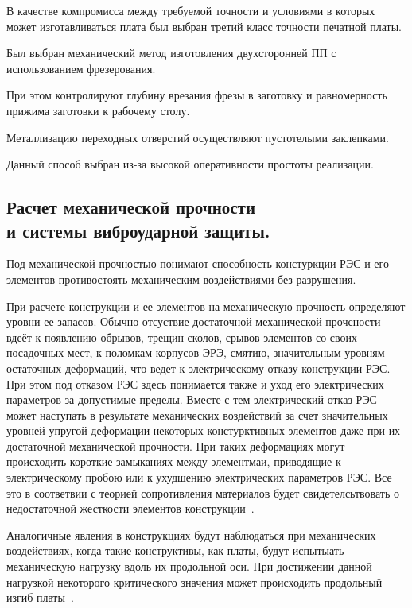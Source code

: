 В качестве компромисса между требуемой точности и условиями в которых
может изготавливаться плата был выбран третий класс точности печатной
платы.


% 
%
Был выбран механический метод изготовления двухсторонней ПП с
использованием фрезерования.

При этом контролируют глубину врезания фрезы
в заготовку и равномерность прижима заготовки к рабочему
столу.

Металлизацию переходных отверстий
осуществляют пустотелыми
заклепками.

Данный способ выбран из-за высокой оперативности простоты реализации.

\subsection{Расчет механической прочности \\
  и системы виброударной защиты.}

Под механической прочностью понимают способность констуркции РЭС и его
элементов противостоять механическим воздействиями без разрушения.

При расчете конструкции и ее элементов на механическую прочность
определяют уровни ее запасов.  Обычно отсуствие достаточной
механической прочсности вдеёт к появлению обрывов, трещин сколов,
срывов элементов со своих посадочных мест, к поломкам корпусов ЭРЭ,
смятию, значительным уровням остаточных деформаций, что ведет к
электрическому отказу конструкции РЭС.
При этом под отказом РЭС здесь понимается также и уход его
электрических параметров за допустимые пределы. Вместе с тем
электрический отказ РЭС может наступать в результате механических
воздействий за счет значительных уровней упругой деформации некоторых
констурктивных элементов даже при их достаточной механической
прочности. При таких деформациях могут происходить короткие замыканиях
между элементмаи, приводящие к электрическому пробою или к ухудшению
электрических параметров РЭС. Все это в соответвии с теорией
сопротивления материалов будет свидетелсьтвовать о недостаточной
жесткости элементов конструкции~\cite{Kalenkovich1989}.

Аналогичные явления в конструкциях будут наблюдаться при механических
воздействиях, когда такие конструктивы, как платы, будут испытыать
механическую нагрузку вдоль их продольной оси.
При достижении данной нагрузкой некоторого критического значения может
происходить продольный изгиб платы~\cite{Kalenkovich1989}.

